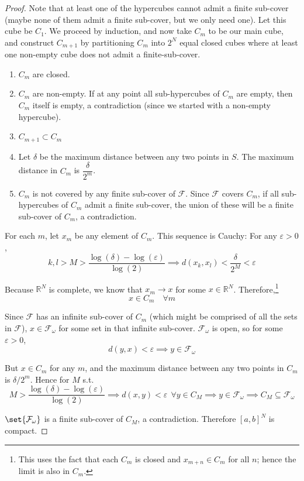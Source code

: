 \documentclass{article}
\begin{document}
\begin{proof}
  Note that at least one of the hypercubes cannot admit a finite sub-cover (maybe none of them admit a finite sub-cover, but we only need one). Let this cube be $C_1$. We proceed by induction, and now take $C_m$ to be our main cube, and construct $C_{m + 1}$ by partitioning $C_m$ into $2^N$ equal closed cubes where at least one non-empty cube does not admit a finite-sub-cover.
  \begin{enumerate}
    \item $C_m$ are closed.

    \item $C_m$ are non-empty. If at any point all sub-hypercubes of $C_m$ are empty, then $C_m$ itself is empty, a contradiction (since we started with a non-empty hypercube).

    \item $C_{m + 1} \subset C_m$

    \item Let $\delta$ be the maximum distance between any two points in $S$. The maximum distance in $C_m$ is $\dfrac{\delta}{2^m}$.

    \item $C_m$ is not covered by any finite sub-cover of $\mathcal{F}$. Since $\mathcal{F}$ covers $C_m$, if all sub-hypercubes of $C_m$ admit a finite sub-cover, the union of these will be a finite sub-cover of $C_m$, a contradiction.
  \end{enumerate}

  For each $m$, let $x_m$ be any element of $C_m$. This sequence is Cauchy: For any $\varepsilon > 0$,
  \[
    k, l > M > \dfrac{\log(\delta) - \log(\varepsilon)}{\log(2)}
    \implies
    d(x_k, x_l)
    <
    \dfrac{\delta}{2^M}
    <
    \varepsilon
  \]

  Because $\mathbb{R}^N$ is complete, we know that $x_m \to x$ for some $x \in \mathbb{R}^N$. Therefore,\footnote{This uses the fact that each $C_m$ is closed and $x_{m + n} \in C_m$ for all $n$; hence the limit is also in $C_m$.}
  \[
    x \in C_m
    \quad
    \forall m
  \]

  Since $\mathcal{F}$ has an infinite sub-cover of $C_m$ (which might be comprised of all the sets in $\mathcal{F}$), $x \in \mathcal{F}_\omega$ for some set in that infinite sub-cover. $\mathcal{F}_\omega$ is open, so for some $\varepsilon > 0$,
  \[
    d(y, x) < \varepsilon \implies y \in \mathcal{F}_\omega
  \]

  But $x \in C_m$ for any $m$, and the maximum distance between any two points in $C_m$ is $\delta / 2^m$. Hence for $M$ s.t.
  \[
    M > \dfrac{\log(\delta) - \log(\varepsilon)}{\log(2)}
    \implies
    d(x, y) < \varepsilon ~~ \forall y \in C_M
    \implies
    y \in \mathcal{F}_\omega
    \implies
    C_M \subseteq \mathcal{F}_\omega
  \]

  $\set{\mathcal{F}_\omega}$ is a finite sub-cover of $C_M$, a contradiction. Therefore $[a, b]^N$ is compact.
\end{proof}
\end{document}
